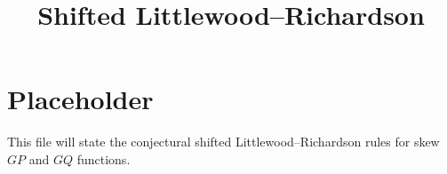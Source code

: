 \documentclass{article}
\title{Shifted Littlewood--Richardson}
\author{}
\date{}
\begin{document}
\maketitle

\section{Placeholder}

This file will state the conjectural shifted Littlewood--Richardson rules for
skew \(GP\) and \(GQ\) functions.
\end{document}
